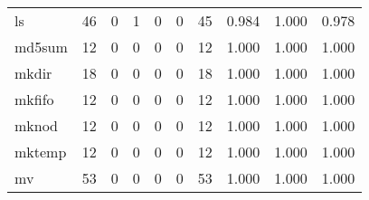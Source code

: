 \begin{longtable}{lp{2.0cm}p{2.0cm}p{2.0cm}p{2.0cm}p{2.0cm}p{2.0cm}p{2.0cm}p{2.0cm}p{2.0cm}}
ls        &                     46 &                                             0 &                                            1 &                                           0 &                                            0 &                                         45 &                                0.984 &                                  1.000 &                                0.978 \\
md5sum    &                     12 &                                             0 &                                            0 &                                           0 &                                            0 &                                         12 &                                1.000 &                                  1.000 &                                1.000 \\
mkdir     &                     18 &                                             0 &                                            0 &                                           0 &                                            0 &                                         18 &                                1.000 &                                  1.000 &                                1.000 \\
mkfifo    &                     12 &                                             0 &                                            0 &                                           0 &                                            0 &                                         12 &                                1.000 &                                  1.000 &                                1.000 \\
mknod     &                     12 &                                             0 &                                            0 &                                           0 &                                            0 &                                         12 &                                1.000 &                                  1.000 &                                1.000 \\
mktemp    &                     12 &                                             0 &                                            0 &                                           0 &                                            0 &                                         12 &                                1.000 &                                  1.000 &                                1.000 \\
mv        &                     53 &                                             0 &                                            0 &                                           0 &                                            0 &                                         53 &                                1.000 &                                  1.000 &                                1.000 \\

\end{longtable}
